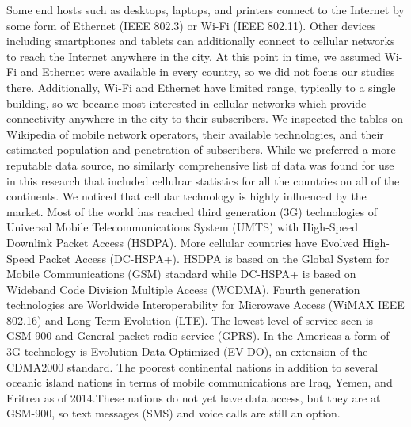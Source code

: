 \documentclass{sigcomm-alternate}
\begin{document}
Some end hosts such as desktops, laptops, and printers connect to the Internet by some form of Ethernet (IEEE 802.3) or Wi-Fi (IEEE 802.11). Other devices including smartphones and tablets can additionally connect to cellular networks to reach the Internet anywhere in the city. At this point in time, we assumed Wi-Fi and Ethernet were available in every country, so we did not focus our studies there. Additionally, Wi-Fi and Ethernet have limited range, typically to a single building, so we became most interested in cellular networks which provide connectivity anywhere in the city to their subscribers. We inspected the tables on Wikipedia of mobile network operators,  their available technologies, and their estimated population and penetration of subscribers. While we preferred a more reputable data source, no similarly comprehensive list of data was found for use in this research that included cellulrar statistics for all the countries on all of the continents. We noticed that cellular technology is highly influenced by the market. Most of the world has reached third generation (3G) technologies of Universal Mobile Telecommunications System (UMTS) with High-Speed Downlink Packet Access (HSDPA). More cellular countries have Evolved High-Speed Packet Access (DC-HSPA+).  HSDPA is based on the Global System for Mobile Communications (GSM) standard while DC-HSPA+ is based on Wideband Code Division Multiple Access (WCDMA). Fourth generation technologies are Worldwide Interoperability for Microwave Access (WiMAX IEEE 802.16) and Long Term Evolution (LTE). The lowest level of service seen is GSM-900 and General packet radio service (GPRS). In the Americas a form of 3G technology is Evolution Data-Optimized (EV-DO), an extension of the CDMA2000 standard.
The poorest continental nations in addition to several oceanic island nations in terms of mobile communications are Iraq, Yemen, and Eritrea as of 2014.These nations do not yet have data access, but they are at GSM-900, so text messages (SMS) and voice calls are still an option.  
\end{document}
